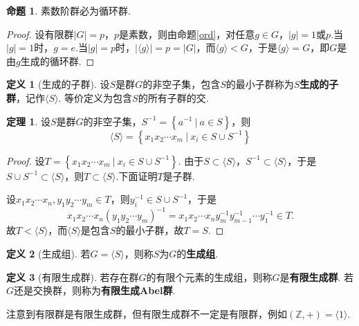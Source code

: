 \documentclass[12pt]{ctexart}
\theoremstyle{definition}
\newtheorem{definition}{定义}
\newtheorem{theorem}{定理}
\newtheorem{proposition}{命题}
\theoremstyle{plain}
\begin{document}
	\begin{proposition}
		素数阶群必为循环群.
	\end{proposition}
	\begin{proof}
		设有限群$|G|=p$，$p$是素数，则由命题\ref{ord}，对任意$g\in G$，$|g|=1$或$p$.当$|g|=1$时，$g=e$.当$|g|=p$时，$|\langle g\rangle|=p=|G|$，而$\langle g\rangle<G$，于是$\langle g\rangle=G$，即$G$是由$g$生成的循环群.
	\end{proof}
	\begin{definition}[生成的子群]
		设$S$是群$G$的非空子集，包含$S$的最小子群称为$S$\textbf{生成的子群}，记作$\langle S\rangle$. 等价定义为包含$S$的所有子群的交.
	\end{definition}
	\begin{theorem}
		设$S$是群$G$的非空子集，$S^{-1}=\left\{a^{-1}\ |\ a\in S\right\}$，则
		$$\langle S\rangle=\left\{x_1x_2\cdots x_m\ |\ x_i\in S\cup S^{-1}\right\}$$
	\end{theorem}
	\begin{proof}
		设$T=\left\{x_1x_2\cdots x_m\ |\ x_i\in S\cup S^{-1}\right\}$. 由于$S\subset\langle S\rangle$，$S^{-1}\subset\langle S\rangle$，于是$S\cup S^{-1}\subset\langle S\rangle$，则$T\subset\langle S\rangle$.下面证明$T$是子群.
		
		设$x_1x_2\cdots x_n,y_1y_2\cdots y_m\in T$，则$y_i^{-1}\in S\cup S^{-1}$，于是
		$$x_1x_2\cdots x_n(y_1y_2\cdots y_m)^{-1}=x_1x_2\cdots x_ny_m^{-1}y_{m-1}^{-1}\cdots y_1^{-1}\in T.$$
		故$T<\langle S\rangle$，而$\langle S\rangle$是包含$S$的最小子群，故$T=S$.
	\end{proof}
	\begin{definition}[生成组]
		若$G=\langle S\rangle$，则称$S$为$G$的\textbf{生成组}.
	\end{definition}
	\begin{definition}[有限生成群]
		若存在群$G$的有限个元素的生成组，则称$G$是\textbf{有限生成群}. 若$G$还是交换群，则称为\textbf{有限生成Abel群}.
	\end{definition}
	注意到有限群是有限生成群，但有限生成群不一定是有限群，例如$(\mathbb{Z},+)=\langle 1\rangle$.
\end{document}
